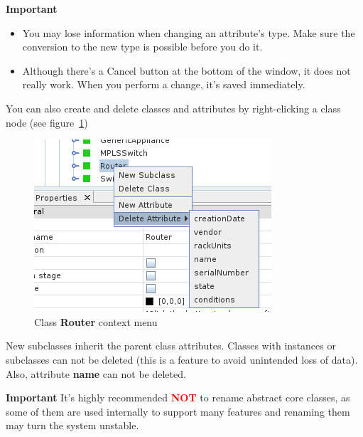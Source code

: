 \documentclass[a4paper]{article}
\begin{document}
			\begin{framed} {\large \textbf{Important}}
				\begin{itemize}
					\item You may lose information when changing an attribute's type. Make sure the conversion to the new type is possible before you do it.
					\item Although there's a Cancel button at the bottom of the window, it does not	really work. When you perform a change, it's saved immediately.
				\end{itemize}
			\end{framed}
			You can also create and delete classes and attributes by right-clicking a class node (see figure~\ref{fig:class_node_menu})
			\begin{figure}[h!]
				\centering
				\includegraphics[width=0.4\linewidth]{img/class_node_menu.png}
				\caption{Class \textbf{Router} context menu}
				\label{fig:class_node_menu}
			\end{figure}
			New subclasses inherit the parent class attributes. Classes with instances or subclasses can not be deleted (this is  a  feature to avoid unintended loss of data). Also, attribute \textbf{name} can not be deleted.
			\begin{framed} {\large \textbf{Important}}
				It's highly recommended \textbf{\textcolor{red}{NOT}} to rename abstract core classes, as some of them are used internally to support many features and renaming them may turn the system unstable.
			\end{framed}
\end{document}
